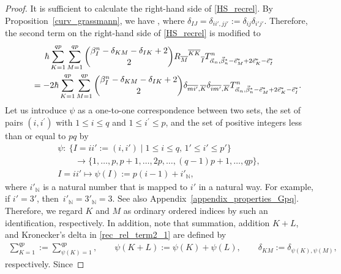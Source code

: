 \documentclass[pdftex]{sigma}
\numberwithin{equation}{section}
\begin{document}
\begin{proof}It is sufficient to calculate the right-hand side of \eqref{HS_recrel}.
By Proposition~\ref{curv_grassmann}, we have
,
where $\delta_{IJ}=\delta_{ii',jj'}:=\delta_{ij}\delta_{i'j'}$.
Therefore, the second term on the right-hand side of \eqref{HS_recrel} is modified to
\begin{gather}
 \hbar
 \sum_{K=1}^{qp}
 \sum_{M=1}^{qp}
 \dbinom{\beta_{I}^{n}-\delta_{KM}-\delta_{IK}+2}{2}
 {{R_{\overline{M}}}^{\overline{K}\overline{K}}}_{\overline{I}}
 T^{n}_{\vec{\alpha}_{n},\vec{\beta}_{n}^{\ast}-\vec{e}_{M}^{\ast}+2\vec{e}_{K}^{\ast}-\vec{e}_{I}^{\ast}}
 \nonumber
 \\
 \qquad=
 -
 2
 \hbar
 \sum_{K=1}^{qp}
 \sum_{M=1}^{qp}
 \dbinom{\beta_{I}^{n}-\delta_{KM}-\delta_{IK}+2}{2}
 \delta_{
 \overline{mi'},
 \overline{K}
 }
 \delta_{
 \overline{im'},
 \overline{K}
 }
 T^{n}_{\vec{\alpha}_{n},\vec{\beta}_{n}^{\ast}-\vec{e}_{M}^{\ast}+2\vec{e}_{K}^{\ast}-\vec{e}_{I}^{\ast}}.
 \label{rec_rel_term2_1}
\end{gather}
Let us introduce $\psi$ as a one-to-one correspondence between two sets, the set of pairs $(i, i^{\prime})$ with $1 \le i \le q$ and $1 \le i^{\prime} \le p$, and the set of positive integers less than or equal to $pq$ by
\begin{gather*}
 \psi
 \colon\
 \{
 I
 =
 ii'
 :=
 (
 i,i'
 )
\mid
 1
 \leq
 i
 \leq
 q,\,
 1'
 \leq
 i'
 \leq
 p'
 \}
 \\
 \qquad\to
 \{
 1,
 \dots,
 p,
 p+1,
 \dots,
 2p,
 \dots,
 (q-1)p+1,
 \dots,
 qp
 \},
 \\
 I
 =
 ii'
 \mapsto
 \psi(I)
 :=
 p(i-1)
 +
 {i'}_{\mathbb{N}},
\end{gather*}
where ${i'}_{\mathbb{N}}$ is a natural number that
is mapped to $i'$ in a natural way. For example, if $i'=3'$, then~${{i'}_{\mathbb{N}}={3'}_{\mathbb{N}}=3}$. See also Appendix~\ref{appendix_properties_Gpq}.
Therefore, we regard $K$ and $M$ as ordinary ordered indices by such an identification, respectively. In addition, note that summation, addition $K+L$, and Kronecker's delta in \eqref{rec_rel_term2_1} are defined by
\begin{align*}
\sum_{K=1}^{qp}
:=
\sum_{\psi(K)=1}^{qp},
\qquad
\psi( K+L )
:=
\psi(K)+\psi(L),
\qquad
\delta_{KM}
:=
\delta_{\psi(K),\psi(M)},
\end{align*}
respectively. Since

\end{proof}
\end{document}
